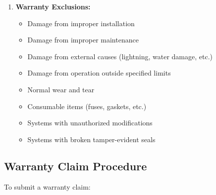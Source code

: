 \documentclass[12pt,a4paper,twoside,openright]{book}
\begin{document}
\begin{enumerate}
    \item \textbf{Warranty Exclusions:}
    \begin{itemize}
        \item Damage from improper installation
        \item Damage from improper maintenance
        \item Damage from external causes (lightning, water damage, etc.)
        \item Damage from operation outside specified limits
        \item Normal wear and tear
        \item Consumable items (fuses, gaskets, etc.)
        \item Systems with unauthorized modifications
        \item Systems with broken tamper-evident seals
    \end{itemize}
\end{enumerate}

\subsection{Warranty Claim Procedure}

To submit a warranty claim:
\end{document}
